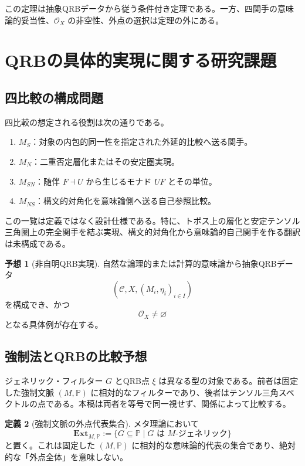 \documentclass[a4paper,11pt]{ltjsarticle}
\theoremstyle{definition}
\newtheorem{definition}{定義}[section]
\newtheorem{conjecture}[definition]{予想}
\theoremstyle{plain}
\newcommand{\Ext}{\mathbf{Ext}}
\begin{document}
この定理は抽象QRBデータから従う条件付き定理である。一方、四関手の意味論的妥当性、$\mathcal O_X$ の非空性、外点の選択は定理の外にある。

\section{QRBの具体的実現に関する研究課題}

\subsection{四比較の構成問題}

四比較の想定される役割は次の通りである。
\begin{enumerate}
 \item $M_S$：対象の内包的同一性を指定された外延的比較へ送る関手。
 \item $M_N$：二重否定層化またはその安定圏実現。
 \item $M_{SN}$：随伴 $F\dashv U$ から生じるモナド $UF$ とその単位。
 \item $M_{NS}$：構文的対角化を意味論側へ送る自己参照比較。
\end{enumerate}

この一覧は定義ではなく設計仕様である。特に、トポス上の層化と安定テンソル三角圏上の完全関手を結ぶ実現、構文的対角化から意味論的自己関手を作る翻訳は未構成である。

\begin{conjecture}[非自明QRB実現]
自然な論理的または計算的意味論から抽象QRBデータ
\begin{equation}
 (\mathcal C,X,(M_i,\eta_i)_{i\in I})
\end{equation}
を構成でき、かつ
\begin{equation}
 \mathcal O_X\neq\varnothing
\end{equation}
となる具体例が存在する。
\end{conjecture}

\subsection{強制法とQRBの比較予想}

ジェネリック・フィルター $G$ とQRB点 $\xi$ は異なる型の対象である。前者は固定した強制文脈 $(M,\mathbb P)$ に相対的なフィルターであり、後者はテンソル三角スペクトルの点である。本稿は両者を等号で同一視せず、関係によって比較する。

\begin{definition}[強制文脈の外点代表集合]
メタ理論において
\begin{equation}
 \Ext_{M,\mathbb P}
 :=
 \{G\subseteq\mathbb P
 \mid G\text{ は }M\text{-ジェネリック}\}
 \label{eq:forcing-external-representatives}
\end{equation}
と置く。これは固定した $(M,\mathbb P)$ に相対的な意味論的代表の集合であり、絶対的な「外点全体」を意味しない。
\end{definition}
\end{document}
